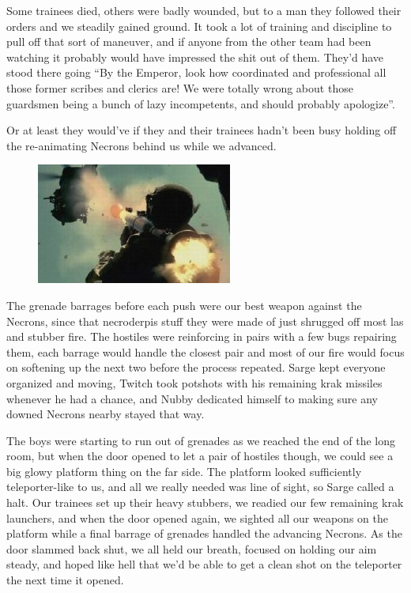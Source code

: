 Some trainees died, others were badly wounded, but to a man they followed their orders and we steadily gained ground. 
It took a lot of training and discipline to pull off that sort of maneuver, and if anyone from the other team had been watching it probably would have impressed the shit out of them. 
They’d have stood there going “By the Emperor, look how coordinated and professional all those former scribes and clerics are! 
We were totally wrong about those guardsmen being a bunch of lazy incompetents, and should probably apologize”. 

Or at least they would’ve if they and their trainees hadn’t been busy holding off the re-animating Necrons behind us while we advanced.

\begin{figure}
	\begin{center}
		\includegraphics[width=\figwidth]{pics/8/49.png}
	\end{center}
\end{figure}
The grenade barrages before each push were our best weapon against the Necrons, since that necroderpis stuff they were made of just shrugged off most las and stubber fire. 
The hostiles were reinforcing in pairs with a few bugs repairing them, each barrage would handle the closest pair and most of our fire would focus on softening up the next two before the process repeated. 
Sarge kept everyone organized and moving, Twitch took potshots with his remaining krak missiles whenever he had a chance, and Nubby dedicated himself to making sure any downed Necrons nearby stayed that way.

The boys were starting to run out of grenades as we reached the end of the long room, but when the door opened to let a pair of hostiles though, we could see a big glowy platform thing on the far side. 
The platform looked sufficiently teleporter-like to us, and all we really needed was line of sight, so Sarge called a halt. 
Our trainees set up their heavy stubbers, we readied our few remaining krak launchers, and when the door opened again, we sighted all our weapons on the platform while a final barrage of grenades handled the advancing Necrons. 
As the door slammed back shut, we all held our breath, focused on holding our aim steady, and hoped like hell that we’d be able to get a clean shot on the teleporter the next time it opened.

